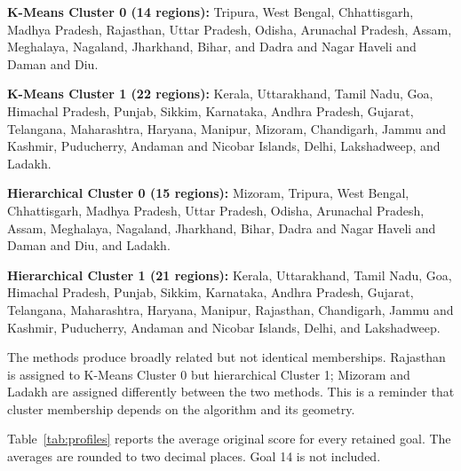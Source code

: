 \documentclass[11pt,a4paper]{article}
\begin{document}
\textbf{K-Means Cluster 0 (14 regions):} Tripura, West Bengal, Chhattisgarh, Madhya Pradesh, Rajasthan, Uttar Pradesh, Odisha, Arunachal Pradesh, Assam, Meghalaya, Nagaland, Jharkhand, Bihar, and Dadra and Nagar Haveli and Daman and Diu.

\textbf{K-Means Cluster 1 (22 regions):} Kerala, Uttarakhand, Tamil Nadu, Goa, Himachal Pradesh, Punjab, Sikkim, Karnataka, Andhra Pradesh, Gujarat, Telangana, Maharashtra, Haryana, Manipur, Mizoram, Chandigarh, Jammu and Kashmir, Puducherry, Andaman and Nicobar Islands, Delhi, Lakshadweep, and Ladakh.

\textbf{Hierarchical Cluster 0 (15 regions):} Mizoram, Tripura, West Bengal, Chhattisgarh, Madhya Pradesh, Uttar Pradesh, Odisha, Arunachal Pradesh, Assam, Meghalaya, Nagaland, Jharkhand, Bihar, Dadra and Nagar Haveli and Daman and Diu, and Ladakh.

\textbf{Hierarchical Cluster 1 (21 regions):} Kerala, Uttarakhand, Tamil Nadu, Goa, Himachal Pradesh, Punjab, Sikkim, Karnataka, Andhra Pradesh, Gujarat, Telangana, Maharashtra, Haryana, Manipur, Rajasthan, Chandigarh, Jammu and Kashmir, Puducherry, Andaman and Nicobar Islands, Delhi, and Lakshadweep.

The methods produce broadly related but not identical memberships. Rajasthan is assigned to K-Means Cluster 0 but hierarchical Cluster 1; Mizoram and Ladakh are assigned differently between the two methods. This is a reminder that cluster membership depends on the algorithm and its geometry.

Table~\ref{tab:profiles} reports the average original score for every retained goal. The averages are rounded to two decimal places. Goal 14 is not included.

\begin{table}[H]
\centering
\caption{Mean original SDG goal scores by cluster for the two methods.}
\label{tab:profiles}
\scriptsize
{}
\end{table}
\end{document}
